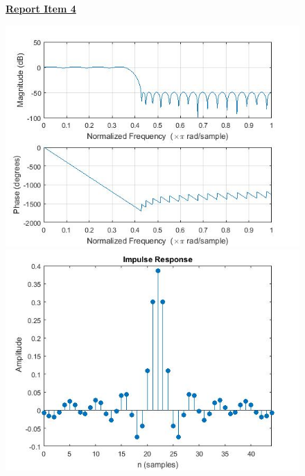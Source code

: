 \documentclass{article}
\begin{document}
\begin{figure}[H]
\color{red}
\underline{\textbf{Report Item 4}}
\color{black}

\includegraphics[scale = .5]{report4}
\includegraphics[scale = .5]{report4i}
\end{figure}
\end{document}
